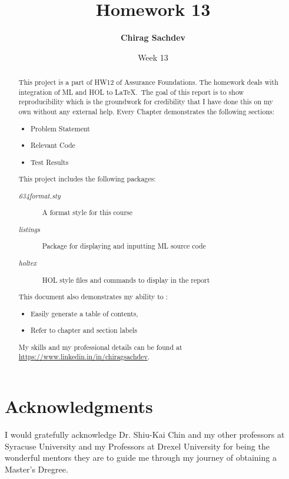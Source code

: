 \documentclass{report}
\title{Homework 13}
\author{\textbf{Chirag Sachdev}}
\date{Week 13}
\begin{document}
\lstset{language=ML, breaklines=true, basicstyle=\small}
\maketitle{}

\begin{abstract}
This project is a part of HW12 of Assurance Foundations. The homework deals with integration of ML and HOL to \LaTeX.\ The goal of this report is to show reproducibility which is the groundwork for credibility that I have done this on my own without any external help. Every Chapter demonstrates the following sections:
	\begin{itemize}
		\item Problem Statement
		\item Relevant Code
		\item Test Results
	\end{itemize}
	
This project includes the following packages:
	\begin{description}
		\item[\emph{634format.sty}] A format style for this course
		\item[\emph{listings}] Package for displaying and inputting ML source code
		\item[\emph{holtex}] HOL style files and commands to display in the report
	\end{description}

This document also demonstrates my ability to :
	\begin{itemize}
		\item Easily generate a table of contents,
		\item Refer to chapter and section labels
	\end{itemize}

My skills and my professional details can be found at \url{https://www.linkedin.in/in/chiragsachdev}.
\end{abstract}

\section*{Acknowledgments}
I would gratefully acknowledge Dr. Shiu-Kai Chin and my other professors at Syracuse University and my Professors at Drexel University for being the wonderful mentors they are to guide me through my journey of obtaining a Master's Dregree.

\tableofcontents{}
\end{document}
